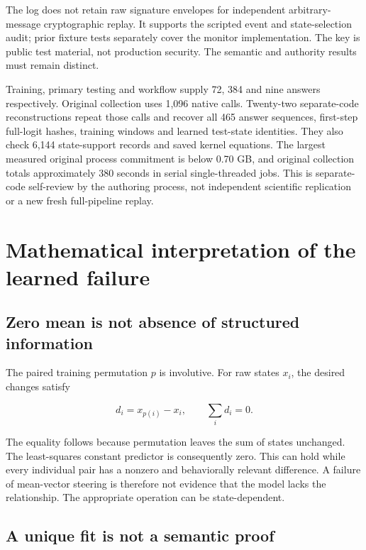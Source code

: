 \documentclass[11pt,letterpaper]{article}
\begin{document}
The log does not retain raw signature envelopes for independent arbitrary-message cryptographic replay. It supports the scripted event and state-selection audit; prior fixture tests separately cover the monitor implementation. The key is public test material, not production security. The semantic and authority results must remain distinct.

Training, primary testing and workflow supply 72, 384 and nine answers respectively. Original collection uses 1,096 native calls. Twenty-two separate-code reconstructions repeat those calls and recover all 465 answer sequences, first-step full-logit hashes, training windows and learned test-state identities. They also check 6,144 state-support records and saved kernel equations. The largest measured original process commitment is below 0.70 GB, and original collection totals approximately 380 seconds in serial single-threaded jobs. This is separate-code self-review by the authoring process, not independent scientific replication or a new fresh full-pipeline replay.

\section{Mathematical interpretation of the learned failure}

\subsection{Zero mean is not absence of structured information}

The paired training permutation \(p\) is involutive. For raw states \(x_i\), the desired changes satisfy

\begin{equation}
d_i=x_{p(i)}-x_i,\qquad \sum_i d_i=0. \tag{10}
\end{equation}

The equality follows because permutation leaves the sum of states unchanged. The least-squares constant predictor is consequently zero. This can hold while every individual pair has a nonzero and behaviorally relevant difference. A failure of mean-vector steering is therefore not evidence that the model lacks the relationship. The appropriate operation can be state-dependent.

\subsection{A unique fit is not a semantic proof}
\end{document}

